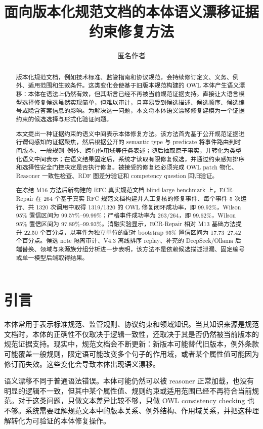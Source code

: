 \documentclass[11pt]{article}
\title{面向版本化规范文档的本体语义漂移证据约束修复方法}
\author{匿名作者}
\date{}
\begin{document}
\maketitle

\begin{abstract}
版本化规范文档，例如技术标准、监管指南和协议规范，会持续修订定义、义务、例外、适用范围和生效条件。这类变化会使基于旧版本规范构建的 OWL 本体产生语义漂移：本体在语法上仍然有效，但其断言已经不再被当前规范证据支持。直接让大语言模型选择修复候选虽然实现简单，但难以审计，且容易受到候选描述、候选顺序、候选编号或隐含答案信息的影响。为解决这一问题，本文将本体语义漂移修复建模为一个证据约束的候选选择与形式化验证问题。

本文提出一种证据约束的语义中间表示本体修复方法。该方法首先基于公开规范证据进行谓词感知的证据聚焦，然后根据公开的 semantic type 与 predicate 将事件路由到时间版本、一般规则--例外、跨句作用域等任务表述；随后抽取原子事实，并转化为类型化语义中间表示；在语义结果固定后，系统才读取有限修复候选，并通过约束感知排序和选择性安全门控决定是否执行修复。被接受的修复还必须完成 OWL patch 物化、Reasoner 一致性检查、RDF 图差分验证和 competency question 回归验证。

在冻结 M16 方法后新构建的 RFC 真实规范文档 blind-large benchmark 上，ECR-Repair 在 264 个基于真实 RFC 规范文档构建并人工复核的修复事件、每个事件 5 次运行、共 1320 次调用中取得 1319/1320 的 OWL 修复闭环成功率，即 99.92\%，Wilson 95\% 置信区间为 99.57\%--99.99\%；严格事件成功率为 263/264，即 99.62\%，Wilson 95\% 置信区间为 97.89\%--99.93\%。消融实验显示，ECR-Repair 相对 M13 基础方法提升 22.50 个百分点，以事件为独立单位的配对 bootstrap 95\% 置信区间为 17.73--27.42 个百分点。候选 note 隔离审计、V4.3 离线排序 replay、补充的 DeepSeek/Ollama 后端替换、领域与来源族分组分析进一步表明，该方法不是依赖候选描述泄漏、固定编号或单一模型后端取得结果。
\end{abstract}

\section{引言}

本体常用于表示标准规范、监管规则、协议约束和领域知识。当其知识来源是规范文档时，本体的正确性不仅取决于逻辑一致性，还取决于其是否仍然被当前版本的规范证据支持。现实中，规范文档会不断更新：新版本可能替代旧版本，例外条款可能覆盖一般规则，限定语可能改变多个句子的作用域，或者某个属性值可能因为修订而失效。这些变化会导致本体出现语义漂移。

语义漂移不同于普通语法错误。本体可能仍然可以被 reasoner 正常加载，也没有明显的逻辑不一致，但其中某个属性值、规则约束或适用范围已经不再符合当前规范。对于这类问题，只做文本差异比较不够，只做 OWL consistency checking 也不够。系统需要理解规范文本中的版本关系、例外结构、作用域关系，并把这种理解转化为可验证的本体修复操作。
\end{document}
